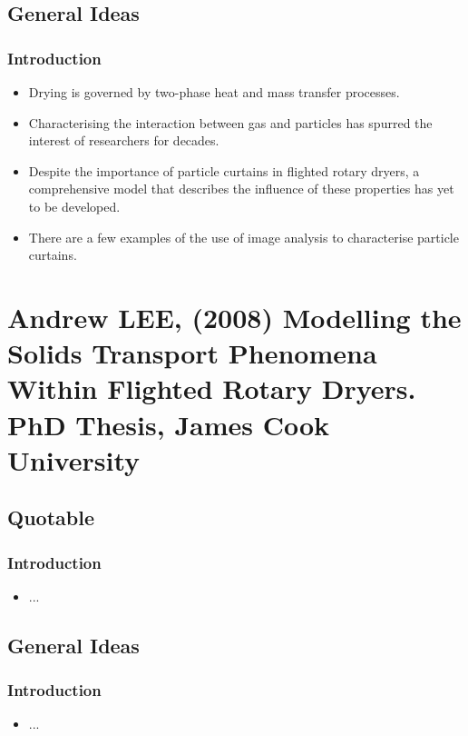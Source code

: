 \documentclass[12pt]{article}
\begin{document}
		
		
	
	\subsection{General Ideas}
	
		\subsubsection{Introduction}
			\begin{itemize}
				\item Drying is governed by two-phase heat and mass transfer processes.
				\item Characterising the interaction between gas and particles has spurred the interest of researchers for
				decades.
				\item Despite the importance of particle curtains in flighted rotary dryers, a
				comprehensive model that describes the influence of these properties has yet to be developed.
				\item There are a few examples of the use of image analysis to characterise particle curtains.
			\end{itemize}


\section{Andrew LEE, (2008) Modelling the Solids Transport Phenomena Within Flighted Rotary Dryers. PhD Thesis, James Cook University}

	\subsection{Quotable}
	
	\subsubsection{Introduction}
	\begin{itemize}
		\item ... 
	\end{itemize}
	
	
	
	
	\subsection{General Ideas}
	
	\subsubsection{Introduction}
	\begin{itemize}
		\item ... 
	\end{itemize}
\end{document}
